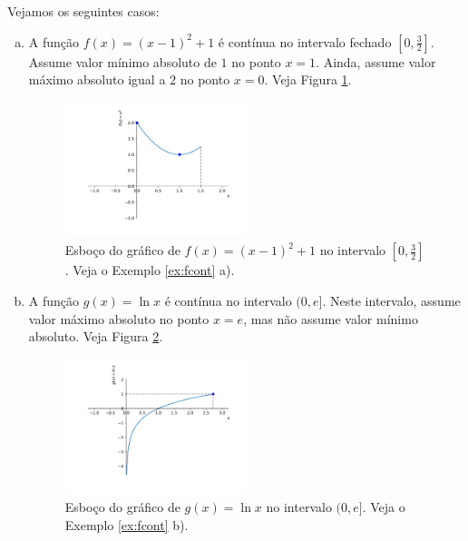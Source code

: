 \begin{ex}\label{ex:fcont}
  Vejamos os seguintes casos:
  \begin{enumerate}[a)]
  \item  A função $f(x) = (x-1)^2+1$ é contínua no intervalo fechado $[0,\frac{3}{2}]$. Assume valor mínimo absoluto de $1$ no ponto $x=1$. Ainda, assume valor máximo absoluto igual a $2$ no ponto $x=0$. Veja Figura \ref{fig:ex_fcont_f}.
  \begin{figure}[H]
    \centering
    \includegraphics[width=0.5\textwidth]{./cap_apderiv/dados/fig_ex_fcont/fig_f}
    \caption{Esboço do gráfico de $f(x) = (x-1)^2+1$ no intervalo $[0,\frac{3}{2}]$. Veja o Exemplo \ref{ex:fcont} a).}
    \label{fig:ex_fcont_f}
  \end{figure}
\item A função $g(x) = \ln x$ é contínua no intervalo $(0, e]$. Neste intervalo, assume valor máximo absoluto no ponto $x=e$, mas não assume valor mínimo absoluto. Veja Figura \ref{fig:ex_fcont_g}.
  \begin{figure}[H]
    \centering
    \includegraphics[width=0.5\textwidth]{./cap_apderiv/dados/fig_ex_fcont/fig_g}
    \caption{Esboço do gráfico de $g(x) = \ln x$ no intervalo $(0,e]$. Veja o Exemplo \ref{ex:fcont} b).}
    \label{fig:ex_fcont_g}
  \end{figure}
  

\end{enumerate}
\end{ex}
